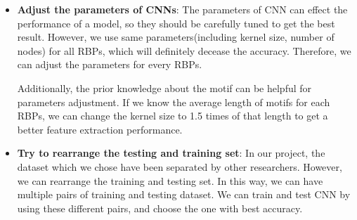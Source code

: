 \documentclass[twoside,twocolumn]{article}
\begin{document}
\begin{itemize}
  \item \textbf{Adjust the parameters of CNNs}: The parameters of CNN can effect the performance of a model, so they should be carefully tuned to get the best result. However, we use same parameters(including kernel size, number of nodes) for all RBPs, which will definitely decease the accuracy. Therefore, we can adjust the parameters for every RBPs.
  
  Additionally, the prior knowledge about the motif can be helpful for parameters adjustment. If we know the average length of motifs for each RBPs, we can change the kernel size to 1.5 times of that length to get a better feature extraction performance.

  \item \textbf{Try to rearrange the testing and training set}: In our project, the dataset which we chose have been separated by other researchers. However, we can rearrange the training and testing set. In this way, we can have multiple pairs of training and testing dataset. We can train and test CNN by using these different pairs, and choose the one with best accuracy.
\end{itemize}
\end{document}

